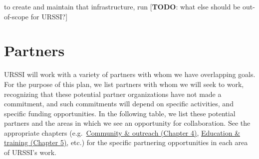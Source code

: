 \documentclass[
]{book}
\begin{document}
to create and maintain that infrastructure, run
{[}\textbf{TODO}: what else should be out-of-scope for URSSI?{]}

\hypertarget{partners}{%
\section{Partners}\label{partners}}

URSSI will work with a variety of partners with whom we have overlapping goals.
For the purpose of this plan, we list partners with whom we will seek to work, recognizing that
these potential partner organizations have not made a commitment, and such commitments will
depend on specific activities, and specific funding opportunities. In the following table, we list
these potential partners and the areas in which we see an opportunity for collaboration. See the
appropriate chapters (e.g.~\href{Ch-Comm}{Community \& outreach (Chapter 4)}, \href{Ch-Edu}{Education \& training (Chapter 5)}, etc.)
for the specific partnering opportunities in each area of URSSI's work.
\end{document}
